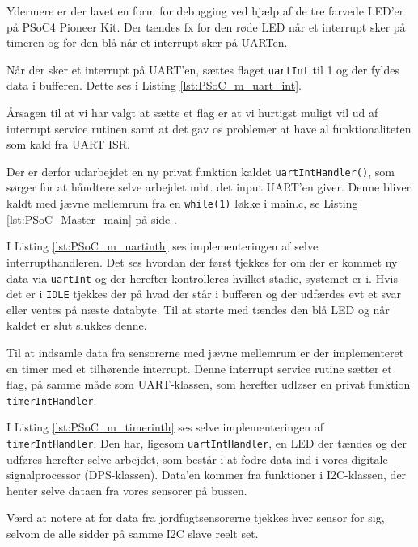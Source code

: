 Ydermere er der lavet en form for debugging ved hjælp af de tre farvede LED'er på PSoC4 Pioneer Kit. Der tændes fx for den røde LED når et interrupt sker på timeren og for den blå når et interrupt sker på UARTen.

Når der sker et interrupt på UART'en, sættes flaget \texttt{uartInt} til 1 og der fyldes data i bufferen. Dette ses i Listing \ref{lst:PSoC_m_uart_int}.



Årsagen til at vi har valgt at sætte et flag er at vi hurtigst muligt vil ud af interrupt service rutinen samt at det gav os problemer at have al funktionaliteten som kald fra UART ISR.

Der er derfor udarbejdet en ny privat funktion kaldet \texttt{uartIntHandler()}, 
som sørger for at håndtere selve arbejdet mht. det input UART'en giver. 
Denne bliver kaldt med jævne mellemrum fra en \texttt{while(1)} løkke i main.c, se Listing \ref{lst:PSoC_Master_main} på side \pageref{lst:PSoC_Master_main}.



I Listing \ref{lst:PSoC_m_uartinth} ses implementeringen af selve interrupthandleren. Det ses hvordan der først tjekkes for om der er kommet ny data via \texttt{uartInt} og der herefter kontrolleres hvilket stadie, systemet er i. Hvis det er i \texttt{IDLE} tjekkes der på hvad der står i bufferen og der udfærdes evt et svar eller ventes på næste databyte. Til at starte med tændes den blå LED og når kaldet er slut slukkes denne.

Til at indsamle data fra sensorerne med jævne mellemrum er der implementeret en timer med et tilhørende interrupt. 
Denne interrupt service rutine sætter et flag, på samme måde som UART-klassen, som herefter udløser en privat funktion \texttt{timerIntHandler}.



I Listing \ref{lst:PSoC_m_timerinth} ses selve implementeringen af \texttt{timerIntHandler}. 
Den har, ligesom \texttt{uartIntHandler}, en LED der tændes og der udføres herefter selve arbejdet, som består i at fodre data ind i vores digitale signalprocessor (DPS-klassen). 
Data'en kommer fra funktioner i I2C-klassen, der henter selve dataen fra vores sensorer på \IIC bussen.

Værd at notere at for data fra jordfugtsensorerne tjekkes hver sensor for sig, selvom de alle sidder på samme I2C slave reelt set.

\clearpage